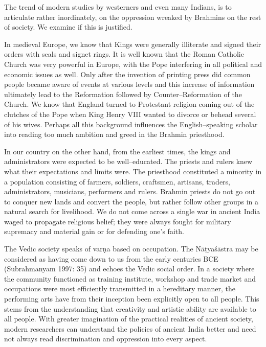 The trend of modern studies by westerners and even many Indians, is to articulate rather inordinately, on the oppression wreaked by Brahmins on the rest of society. We examine if this is justified.

\vskip 2pt

In medieval Europe, we know that Kings were generally illiterate and signed their orders with seals and signet rings. It is well known that the Roman Catholic Church was very powerful in Europe, with the Pope interfering in all political and economic issues as well. Only after the invention of printing press did common people became aware of events at various levels and this increase of information ultimately lead to the Reformation followed by Counter–Reformation of the Church. We know that England turned to Protestant religion coming out of the clutches of the Pope when King Henry VIII wanted to divorce or behead several of his wives. Perhaps all this background influences the English–speaking scholar into reading too much ambition and greed in the Brahmin priesthood.

\vskip 2pt

In our country on the other hand, from the earliest times, the kings and administrators were expected to be well–educated. The priests and rulers knew what their expectations and limits were. The priesthood constituted a minority in a population consisting of farmers, soldiers, craftsmen, artisans, traders, administrators, musicians, performers and rulers. Brahmin priests do not go out to conquer new lands and convert the people, but rather follow other groups in a natural search for livelihood. We do not come across a single war in ancient India waged to propagate religious belief; they were always fought for military supremacy and material gain or for defending one’s faith.

The Vedic society speaks of varṇa based on occupation. The Nāṭyaśāstra may be considered as having come down to us from the early centuries BCE (Subrahmanyam 1997: 35) and echoes the Vedic social order. In a society where the community functioned as training institute, workshop and trade market and occupations were most efficiently transmitted in a hereditary manner, the performing arts have from their inception been explicitly open to all people. This stems from the understanding that creativity and artistic ability are available to all people. With greater imagination of the practical realities of ancient society, modern researchers can understand the policies of ancient India better and need not always read discrimination and oppression into every aspect.

